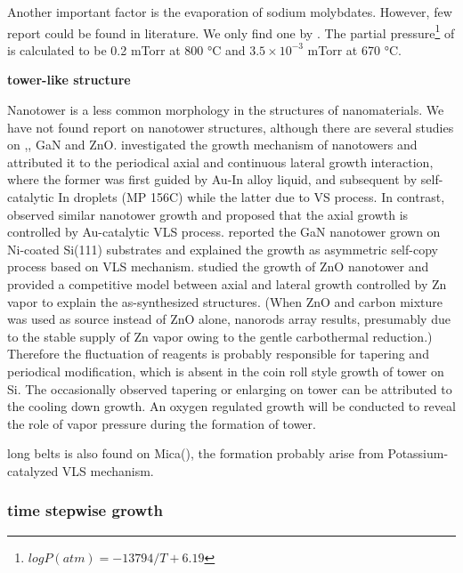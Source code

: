 Another important factor is the evaporation of sodium molybdates. However, few report could be found in literature. We only find one by \citeauthor{Kazenas2010}.\cite{Kazenas2010} The partial pressure\footnote{$logP(atm)= -13794/T + 6.19$} of  is calculated to be 0.2 mTorr at 800 \si{\degreeCelsius} and $3.5\times 10^{-3}$ mTorr at 670 \si{\degreeCelsius}.

\textbf{tower-like structure}

Nanotower is a less common morphology in the structures of nanomaterials.\cite{Kharissova2010} We have not found report on   nanotower structures, although there are several studies on ,\cite{Jean2010,Yan2007}, GaN\cite{Xiao2012} and ZnO\cite{Zhang2013c}. \citeauthor{Jean2010} investigated the growth mechanism of  nanotowers and attributed it to the periodical axial and continuous lateral growth interaction, where the former was first guided by Au-In alloy liquid, and subsequent by self-catalytic In droplets (MP 156C) while the latter due to VS process. In contrast, \citeauthor{Yan2007} observed similar  nanotower growth and proposed that the axial growth is controlled by Au-catalytic VLS process. \citeauthor{Xiao2012} reported the GaN nanotower grown on Ni-coated Si(111) substrates and explained the growth as asymmetric self-copy process based on VLS mechanism. \citeauthor{Zhang2013c} studied the growth of ZnO nanotower and provided a competitive model between axial and lateral growth controlled by Zn vapor to explain the as-synthesized structures. (When ZnO and carbon mixture was used as source instead of ZnO alone, nanorods array results, presumably due to the stable supply of Zn vapor owing to the gentle carbothermal reduction.) Therefore the fluctuation of reagents is probably responsible for tapering and periodical modification, which is absent in the coin roll style growth of  tower on Si. The occasionally observed tapering or enlarging on  tower can be attributed to the cooling down growth.  An oxygen regulated growth will be conducted to reveal the role of vapor pressure during the formation of tower.

long belts  is also found on Mica(), the formation probably arise from Potassium-catalyzed VLS mechanism.\cite{Hu2011}

\subsubsection{time stepwise growth}

